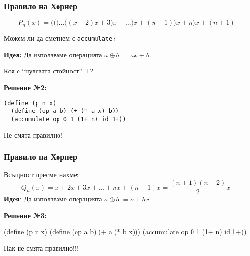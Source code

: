 \documentclass{beamer}
\begin{document}
\newcommand{\pnxh}{\Bigg(\bigg(\Big(\ldots\big((x + 2)x + 3\big)x + \ldots\Big)x + (n-1)\bigg)x + n\Bigg)x + (n+1)}

\begin{frame}[fragile]
  \frametitle{Правило на Хорнер}

  \begin{equation*}
    P_n(x) = \pnxh
  \end{equation*}

  \pause

  \alert{Можем ли да сметнем с \tt{accumulate}?}

  \pause

  \textbf{Идея:} Да използваме операцията $a \oplus b := ax + b$.

  \pause

  \alert{Коя е ``нулевата стойност''  $\bot$?}
  \vspace{1em}

  \pause

  \textbf{Решение №2:}
\begin{verbatim}
(define (p n x)
  (define (op a b) (+ (* a x) b))
  (accumulate op 0 1 (1+ n) id 1+))
\end{verbatim}

  \pause

  \alert{Не смята правилно!}
\end{frame}

\begin{frame}[fragile]
  \frametitle{Правило на Хорнер}

Всъщност пресметнахме:
\begin{equation*}
  Q_n(x) = x + 2x + 3x + \ldots + nx + (n+1)x= \frac{(n+1)(n+2)}2x.
\end{equation*}
  \pause
  \textbf{Идея:} Да използваме операцията $a \oplus b := a + bx$.
  \vspace{1em}
  \pause

  \textbf{Решение №3:}
\begin{semiverbatim}
(define (p n x)
  (define (op a b) (+ a (* b x)))
  (accumulate op 0 1 (1+ n) id 1+))
\end{semiverbatim}

  \pause

  \alert{Пак не смята правилно!!!}

\end{frame}
\end{document}
